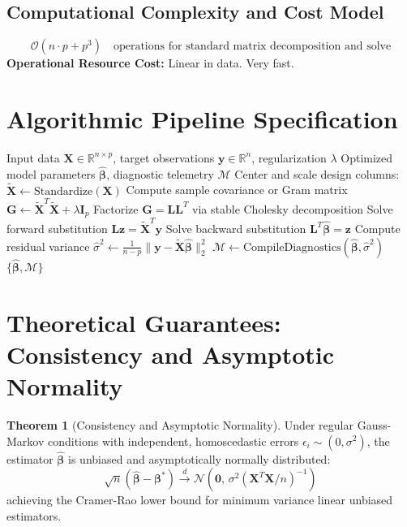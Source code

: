 \documentclass[11pt,a4paper]{article}
\theoremstyle{definition}
\newtheorem{theorem}{\textbf{Theorem}}[section]
\begin{document}
\subsection{Computational Complexity and Cost Model}
\begin{equation}
\mathcal{O}(n \cdot p + p^3) \quad \text{operations for standard matrix decomposition and solve}
\end{equation}
\textbf{Operational Resource Cost:} Linear in data. Very fast.

\section{Algorithmic Pipeline Specification}

\begin{algorithm}[H]
\caption{Isolation forest Execution}
\begin{algorithmic}[1]
\Require Input data $\mathbf{X} \in \mathbb{R}^{n \times p}$, target observations $\mathbf{y} \in \mathbb{R}^n$, regularization $\lambda$
\Ensure Optimized model parameters $\hat{\boldsymbol{\beta}}$, diagnostic telemetry $\mathcal{M}$
\State Center and scale design columns: $\tilde{\mathbf{X}} \gets \text{Standardize}(\mathbf{X})$
\State Compute sample covariance or Gram matrix $\mathbf{G} \gets \tilde{\mathbf{X}}^T \tilde{\mathbf{X}} + \lambda \mathbf{I}_p$
\State Factorize $\mathbf{G} = \mathbf{L} \mathbf{L}^T$ via stable Cholesky decomposition
\State Solve forward substitution $\mathbf{L} \mathbf{z} = \tilde{\mathbf{X}}^T \mathbf{y}$
\State Solve backward substitution $\mathbf{L}^T \hat{\boldsymbol{\beta}} = \mathbf{z}$
\State Compute residual variance $\hat{\sigma}^2 \gets \frac{1}{n - p} \| \mathbf{y} - \tilde{\mathbf{X}} \hat{\boldsymbol{\beta}} \|_2^2$
\State $\mathcal{M} \gets \text{CompileDiagnostics}(\hat{\boldsymbol{\beta}}, \hat{\sigma}^2)$
\State \Return $\{\hat{\boldsymbol{\beta}}, \mathcal{M}\}$
\end{algorithmic}
\end{algorithm}

\section{Theoretical Guarantees: Consistency and Asymptotic Normality}

\begin{theorem}[Consistency and Asymptotic Normality]
Under regular Gauss-Markov conditions with independent, homoscedastic errors $\epsilon_i \sim (0, \sigma^2)$, the estimator $\hat{\boldsymbol{\beta}}$ is unbiased and asymptotically normally distributed:
\begin{equation}
\sqrt{n}(\hat{\boldsymbol{\beta}} - \boldsymbol{\beta}^*) \xrightarrow{d} \mathcal{N}\left(\mathbf{0}, \, \sigma^2 (\mathbf{X}^T \mathbf{X} / n)^{-1}\right)
\end{equation}
achieving the Cramer-Rao lower bound for minimum variance linear unbiased estimators.
\end{theorem}
\end{document}
